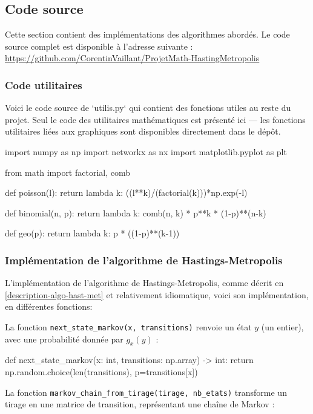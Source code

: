\documentclass{article}
\begin{document}
\subsection{Code source}

Cette section contient des implémentations des algorithmes abordés. Le code source complet est disponible à l'adresse suivante : \url{https://github.com/CorentinVaillant/ProjetMath-HastingMetropolis}

\subsubsection{Code utilitaires}

Voici le code source de `utilis.py` qui contient des fonctions utiles au reste du projet. Seul le code des utilitaires mathématiques est présenté ici — les fonctions utilitaires liées aux graphiques sont disponibles directement dans le dépôt.
\begin{python}
import numpy as np
import networkx as nx
import matplotlib.pyplot as plt

from math import factorial, comb

def poisson(l):
    return lambda k: ((l**k)/(factorial(k)))*np.exp(-l)

def binomial(n, p):
    return lambda k: comb(n, k) * p**k * (1-p)**(n-k)

def geo(p):
    return lambda k: p * ((1-p)**(k-1))
\end{python}
\newpage
\subsubsection{Implémentation de l'algorithme de Hastings-Metropolis}

L'implémentation de l'algorithme de Hastings-Metropolis, comme décrit en \ref{description-algo-hast-met} et relativement idiomatique, voici son implémentation, en différentes fonctions: 

La fonction \texttt{next\_state\_markov(x, transitions)} renvoie un état $y$ (un entier), avec une probabilité donnée par $g_x(y)$ :

\begin{python}
def next_state_markov(x: int, transitions: np.array) -> int:
    return np.random.choice(len(transitions), p=transitions[x])
\end{python}

La fonction \texttt{markov\_chain\_from\_tirage(tirage, nb\_etats)} transforme un tirage en une matrice de transition, représentant une chaîne de Markov :
\end{document}
